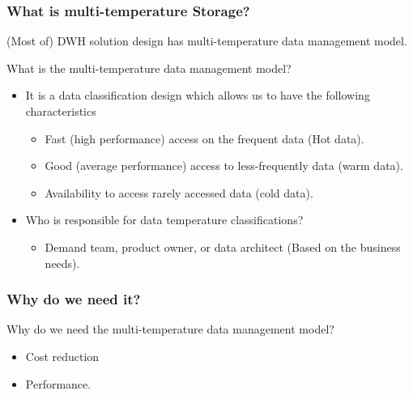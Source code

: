 \begin{frame}
\frametitle{What is multi-temperature Storage?}

\begin{wideitemize}
\item (Most of) DWH solution design has multi-temperature data management model.
\item What is the multi-temperature data management model?
\begin{itemize}[<+->]
	\item It is a data classification design which allows us to have the following characteristics
	\begin{itemize}[<+->]
		\item Fast (high performance) access on the frequent data (Hot data).
		\item Good (average performance) access to less-frequently data (warm data).
		\item Availability to access rarely accessed data (cold data).
	\end{itemize}
	\item Who is responsible for data temperature classifications?
	\begin{itemize}[<+->]
		\item Demand team, product owner, or data architect (Based on the business needs).
	\end{itemize}
\end{itemize}
\end{wideitemize}
\end{frame}


\begin{frame}
\frametitle{Why do we need it?}

\begin{wideitemize}
\item Why do we need the multi-temperature data management model?
\begin{itemize}[<+->]
\item Cost reduction \blue{\faDollar \faDollar \faDollar \faDollar}
\item Performance.
\end{itemize}
\end{wideitemize}
\end{frame}


